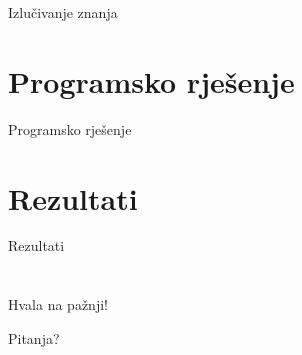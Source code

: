 \documentclass[utf8]{beamer}
\begin{document}
\begin{frame}{Izlučivanje znanja}
\end{frame}

\section{Programsko rješenje}
\begin{frame}{Programsko rješenje}
\end{frame}


\section{Rezultati}
\begin{frame}{Rezultati}
\end{frame}


\section*{}
\begin{frame}{}
\center
\Huge{Hvala na pažnji!}
\end{frame}

\begin{frame}{}
\center
\Huge{Pitanja?}

\end{frame}
\end{document}
